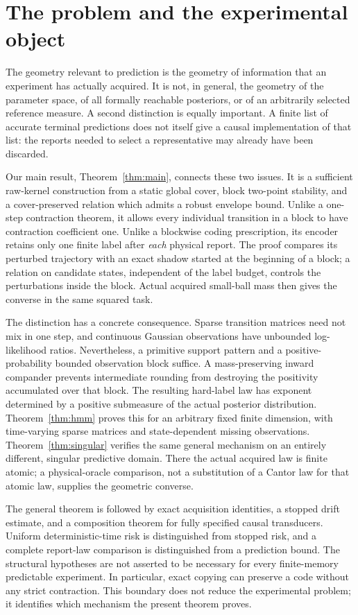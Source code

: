 \section{The problem and the experimental object}\label{sec:experiments}
The geometry relevant to prediction is the geometry of information that an experiment has actually acquired. It is not, in general, the geometry of the parameter space, of all formally reachable posteriors, or of an arbitrarily selected reference measure. A second distinction is equally important. A finite list of accurate terminal predictions does not itself give a causal implementation of that list: the reports needed to select a representative may already have been discarded.

Our main result, Theorem~\ref{thm:main}, connects these two issues. It is a sufficient raw-kernel construction from a static global cover, block two-point stability, and a cover-preserved relation which admits a robust envelope bound. Unlike a one-step contraction theorem, it allows every individual transition in a block to have contraction coefficient one. Unlike a blockwise coding prescription, its encoder retains only one finite label after \emph{each} physical report. The proof compares its perturbed trajectory with an exact shadow started at the beginning of a block; a relation on candidate states, independent of the label budget, controls the perturbations inside the block. Actual acquired small-ball mass then gives the converse in the same squared task.

The distinction has a concrete consequence. Sparse transition matrices need not mix in one step, and continuous Gaussian observations have unbounded log-likelihood ratios. Nevertheless, a primitive support pattern and a positive-probability bounded observation block suffice. A mass-preserving inward compander prevents intermediate rounding from destroying the positivity accumulated over that block. The resulting hard-label law has exponent determined by a positive submeasure of the actual posterior distribution. Theorem~\ref{thm:hmm} proves this for an arbitrary fixed finite dimension, with time-varying sparse matrices and state-dependent missing observations. Theorem~\ref{thm:singular} verifies the same general mechanism on an entirely different, singular predictive domain. There the actual acquired law is finite atomic; a physical-oracle comparison, not a substitution of a Cantor law for that atomic law, supplies the geometric converse.

The general theorem is followed by exact acquisition identities, a stopped drift estimate, and a composition theorem for fully specified causal transducers. Uniform deterministic-time risk is distinguished from stopped risk, and a complete report-law comparison is distinguished from a prediction bound. The structural hypotheses are not asserted to be necessary for every finite-memory predictable experiment. In particular, exact copying can preserve a code without any strict contraction. This boundary does not reduce the experimental problem; it identifies which mechanism the present theorem proves.

